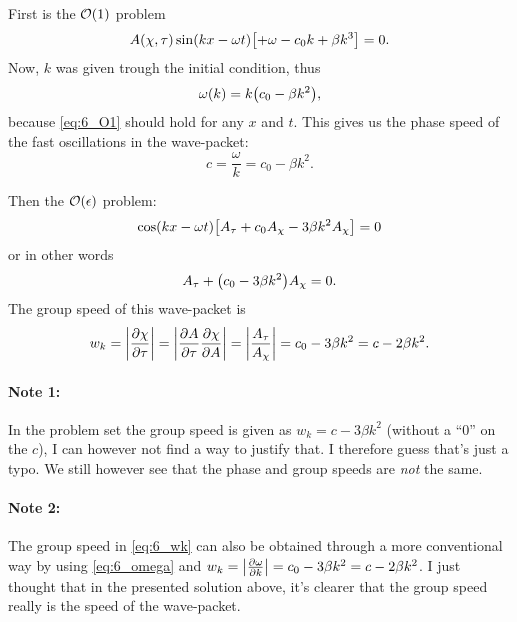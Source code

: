 \documentclass[11pt,letter, swedish, english
]{article}
\begin{document}
First is the $\order{1}$ problem
\begin{equation}\label{eq:6_O1}
A(\chi,\tau)\sin(kx-\omega{t})
\qty[+\omega-c_0k+\beta k^3]=0.
\end{equation}
Now, $k$ was given trough the initial condition, thus
\begin{equation}\label{eq:6_omega}
\omega(k)=k\qty(c_0-\beta k^2),
\end{equation}
because \eqref{eq:6_O1} should hold for any $x$ and $t$. This gives us
the phase speed of the fast oscillations in the wave-packet:
\begin{equation}
c=\frac{\omega}{k}=c_0-\beta k^2.
\end{equation}

Then the $\order{\epsilon}$ problem:
\begin{equation}
\cos(kx-\omega t)
\qty[A_\tau+c_0 A_\chi-3\beta k^2A_\chi]=0
\end{equation}
or in other words
\begin{equation}
A_\tau+\qty(c_0 -3\beta k^2)A_\chi=0.
\end{equation}
The group speed of this wave-packet is
\begin{equation}\label{eq:6_wk}
w_k=\abs{\pdv{\chi}{\tau}}=\abs{\pdv{A}{\tau}\pdv{\chi}{A}}
=\abs{\frac{A_\tau}{A_\chi}}
=c_0 -3\beta k^2=c-2\beta k^2.
\end{equation}

\paragraph{Note 1: }
In the problem set the group speed is given as $w_k=c-3\beta k^2$
(without a ``0'' on the $c$), I can however not find a way to justify
that. I therefore guess that's just a typo. We still however see that
the phase and group speeds are \emph{not} the same.

\paragraph{Note 2: }
The group speed in \eqref{eq:6_wk} can also be obtained through a
more conventional way by using \eqref{eq:6_omega} and
$w_k=\abs{\pdv{\omega}{k}}=c_0 -3\beta k^2=c-2\beta k^2$. I just
thought that in the presented solution above, it's clearer that the
group speed really is the speed of the wave-packet. 
\end{document}
